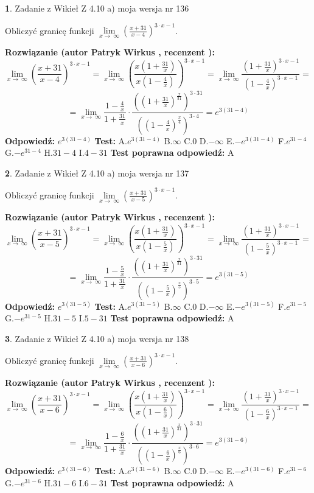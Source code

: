 \documentclass[12pt, a4paper]{article}
\theoremstyle{definition} %
\newtheorem{zad}{}
\newcommand{\zadStart}[1]{\begin{zad}#1\newline}
\newcommand{\zadStop}{\end{zad}}
\newcommand{\rozwStart}[2]{\noindent \textbf{Rozwiązanie (autor #1 , recenzent #2): }\newline}
\newcommand{\rozwStop}{\newline}
\newcommand{\odpStart}{\noindent \textbf{Odpowiedź:}\newline}
\newcommand{\odpStop}{\newline}
\newcommand{\testStart}{\noindent \textbf{Test:}\newline}
\newcommand{\testStop}{\newline}
\newcommand{\kluczStart}{\noindent \textbf{Test poprawna odpowiedź:}\newline}
\newcommand{\kluczStop}{\newline}
\begin{document}
\zadStart{Zadanie z Wikieł Z 4.10 a) moja wersja nr 136}


Obliczyć granicę funkcji  $\lim\limits_{x\to\ \infty}(\frac{x+31}{x-4})^{3\cdot x-1}$.
\zadStop
\rozwStart{Patryk Wirkus}{}
$$\lim\limits_{x\to\ \infty}(\frac{x+31}{x-4})^{3\cdot x-1} = \lim\limits_{x\to\ \infty}(\frac{x(1+\frac{31}{x})}{x(1-\frac{4}{x})})^{3\cdot x-1}=\lim\limits_{x\to\ \infty}\frac{(1+\frac{31}{x})^{3\cdot x-1}}{(1-\frac{4}{x})^{3\cdot x-1}}=$$
$$=\lim\limits_{x\to\ \infty}\frac{1-\frac{4}{x}}{1+\frac{31}{x}}\cdot\frac{((1+\frac{31}{x})^{\frac{x}{31}})^{3\cdot31}}{((1-\frac{4}{x})^{\frac{x}{4}})^{3\cdot4}}=e^{3(31-4)}$$
\rozwStop
\odpStart
$e^{3(31-4)}$
\odpStop
\testStart
A.$e^{3(31-4)}$ B.$\infty$ C.$0$ D.$-\infty$ E.$-e^{3(31-4)}$
F.$e^{31-4}$ G.$-e^{31-4}$
H.$31-4$
I.$4-31$
\testStop
\kluczStart
A
\kluczStop



\zadStart{Zadanie z Wikieł Z 4.10 a) moja wersja nr 137}


Obliczyć granicę funkcji  $\lim\limits_{x\to\ \infty}(\frac{x+31}{x-5})^{3\cdot x-1}$.
\zadStop
\rozwStart{Patryk Wirkus}{}
$$\lim\limits_{x\to\ \infty}(\frac{x+31}{x-5})^{3\cdot x-1} = \lim\limits_{x\to\ \infty}(\frac{x(1+\frac{31}{x})}{x(1-\frac{5}{x})})^{3\cdot x-1}=\lim\limits_{x\to\ \infty}\frac{(1+\frac{31}{x})^{3\cdot x-1}}{(1-\frac{5}{x})^{3\cdot x-1}}=$$
$$=\lim\limits_{x\to\ \infty}\frac{1-\frac{5}{x}}{1+\frac{31}{x}}\cdot\frac{((1+\frac{31}{x})^{\frac{x}{31}})^{3\cdot31}}{((1-\frac{5}{x})^{\frac{x}{5}})^{3\cdot5}}=e^{3(31-5)}$$
\rozwStop
\odpStart
$e^{3(31-5)}$
\odpStop
\testStart
A.$e^{3(31-5)}$ B.$\infty$ C.$0$ D.$-\infty$ E.$-e^{3(31-5)}$
F.$e^{31-5}$ G.$-e^{31-5}$
H.$31-5$
I.$5-31$
\testStop
\kluczStart
A
\kluczStop



\zadStart{Zadanie z Wikieł Z 4.10 a) moja wersja nr 138}


Obliczyć granicę funkcji  $\lim\limits_{x\to\ \infty}(\frac{x+31}{x-6})^{3\cdot x-1}$.
\zadStop
\rozwStart{Patryk Wirkus}{}
$$\lim\limits_{x\to\ \infty}(\frac{x+31}{x-6})^{3\cdot x-1} = \lim\limits_{x\to\ \infty}(\frac{x(1+\frac{31}{x})}{x(1-\frac{6}{x})})^{3\cdot x-1}=\lim\limits_{x\to\ \infty}\frac{(1+\frac{31}{x})^{3\cdot x-1}}{(1-\frac{6}{x})^{3\cdot x-1}}=$$
$$=\lim\limits_{x\to\ \infty}\frac{1-\frac{6}{x}}{1+\frac{31}{x}}\cdot\frac{((1+\frac{31}{x})^{\frac{x}{31}})^{3\cdot31}}{((1-\frac{6}{x})^{\frac{x}{6}})^{3\cdot6}}=e^{3(31-6)}$$
\rozwStop
\odpStart
$e^{3(31-6)}$
\odpStop
\testStart
A.$e^{3(31-6)}$ B.$\infty$ C.$0$ D.$-\infty$ E.$-e^{3(31-6)}$
F.$e^{31-6}$ G.$-e^{31-6}$
H.$31-6$
I.$6-31$
\testStop
\kluczStart
A
\kluczStop
\end{document}
